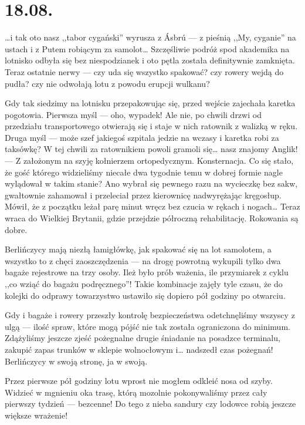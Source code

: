 \chapter*{18.08.}

…i tak oto nasz ,,tabor cygański'' wyrusza z Ásbrú --- z pieśnią ,,My, cyganie'' na ustach i z Putem robiącym za samolot… Szczęśliwie podróż spod akademika na lotnisko odbyła się bez niespodzianek i oto pętla została definitywnie zamknięta. Teraz ostatnie nerwy --- czy uda się wszystko spakować? czy rowery wejdą do pudła? czy nie odwołają lotu z powodu erupcji wulkanu?

Gdy tak siedzimy na lotnisku przepakowując się, przed wejście zajechała karetka pogotowia. Pierwsza myśl --- oho, wypadek! Ale nie, po chwili drzwi od przedziału transportowego otwierają się i staje w nich ratownik z walizką w ręku. Druga myśl --- może szef jakiegoś szpitala jedzie na wczasy i karetka robi za taksówkę? W tej chwili za ratownikiem powoli gramoli się… nasz znajomy Anglik! --- Z założonym na szyję kołnierzem ortopedycznym. Konsternacja. Co się stało, że gość którego widzieliśmy niecałe dwa tygodnie temu w dobrej formie nagle wylądował w takim stanie? Ano wybrał się pewnego razu na wycieczkę bez sakw, gwałtownie zahamował i przeleciał przez kierownicę nadwyrężając kręgosłup. Mówił, że z początku leżał parę minut wręcz bez czucia w rękach i nogach… Teraz wraca do Wielkiej Brytanii, gdzie przejdzie półroczną rehabilitację. Rokowania są dobre.

Berlińczycy mają niezłą łamigłówkę, jak spakować się na lot samolotem, a wszystko to z chęci zaoszczędzenia --- na drogę powrotną wykupili tylko dwa bagaże rejestrowe na trzy osoby. Ileż było prób ważenia, ile przymiarek z cyklu ,,co wziąć do bagażu podręcznego''! Takie kombinacje zajęły tyle czasu, że do kolejki do odprawy towarzystwo ustawiło się dopiero pół godziny po otwarciu.


Gdy i bagaże i rowery przeszły kontrolę bezpieczeństwa odetchnęliśmy wszyscy z ulgą --- ilość spraw, które mogą pójść nie tak została ograniczona do minimum. Zdążyliśmy jeszcze zjeść pożegnalne drugie śniadanie na posadzce terminalu, zakupić zapas trunków w sklepie wolnocłowym i… nadszedł czas pożegnań! Berlińczycy w swoją stronę, ja w swoją.

Przez pierwsze pół godziny lotu wprost nie mogłem odkleić nosa od szyby. Widzieć w mgnieniu oka trasę, którą mozolnie pokonywaliśmy przez cały pierwszy tydzień --- bezcenne! Do tego z nieba sandury czy lodowce robią jeszcze większe wrażenie!

